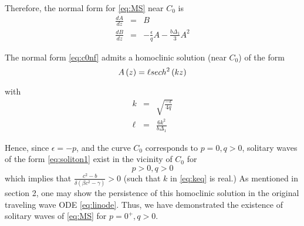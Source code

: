 Therefore, the normal form for \eqref{eq:MS} near $C_0$ is
\begin{subequations}
\begin{eqnarray}
\frac{dA}{dz} &=& B \\
\frac{dB}{dz} &=& -\frac{\epsilon}{q} A - \frac{ b \Delta_1}{3}  A^2
\end{eqnarray}
\end{subequations}

The normal form \eqref{eq:c0nf} admits a homoclinic solution (near $C_0$) of the form 
\begin{equation} \label{eq:soliton1}
A\left(z\right) = \ell \space sech^2\left(k z\right)
\end{equation}

with 
\begin{subequations} 
\begin{eqnarray}
k &=& \sqrt{\frac{-\epsilon}{4q}} \label{eq:keq} \\
\ell &=& \frac{ 6 k^2 }{ b \Delta_1 } 
\end{eqnarray}
\end{subequations}


Hence, since $\epsilon = - p $, and the curve $C_0$ corresponds to $p=0,q>0$, solitary waves of the 
form \eqref{eq:soliton1} exist in the vicinity of $C_0$ for 
\begin{equation}
p > 0, q > 0 
\end{equation}
which implies that $  \frac{c^2 - b}{\delta\left(\beta c^2 - \gamma\right)} > 0 $
(such that $k$ in \eqref{eq:keq} is real.)  As mentioned in section 2, one may show the persistence
of this homoclinic solution in the original traveling wave ODE \eqref{eq:linode}. Thus, we have 
demonstrated the existence of solitary waves of \eqref{eq:MS} for $p=0^+, q>0$. 


